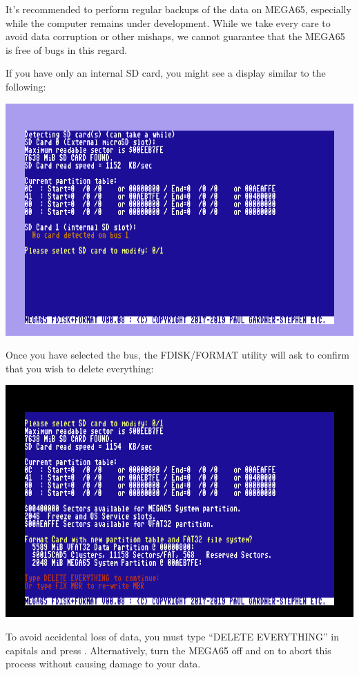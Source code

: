 It's recommended to perform regular backups of the data on
MEGA65, especially while the computer remains under
development.  While we take every care to avoid data corruption or
other mishaps, we cannot guarantee that the MEGA65 is free of bugs in
this regard.

If you have only an internal SD card, you might see a
display similar to the following:

\includegraphics[width=\linewidth]{images/ss-m65fdisk-busselect.png}

Once you have selected the bus, the FDISK/FORMAT utility will ask
to confirm that you wish to delete everything:

\includegraphics[width=\linewidth]{images/ss-m65fdisk-typesomething.png}

To avoid accidental loss of data, you
must type ``DELETE EVERYTHING'' in capitals and press
.  Alternatively, turn the MEGA65 off and on to
abort this process without causing damage to your data.

